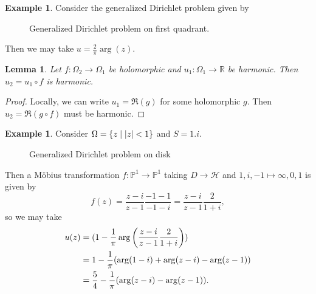 \documentclass[leqno, openany]{memoir}
\newtheorem{lem}[thm]{Lemma}
\theoremstyle{definition}
\newtheorem{exm}[thm]{Example}
\theoremstyle{remark}
\theoremstyle{plain}
\theoremstyle{definition}
\theoremstyle{remark}
\newcommand{\R}{\mathbb{R}}
\renewcommand{\P}{\mathbb{P}}
\newcommand{\mc}[1]{\mathcal{#1}}
\begin{document}
\begin{exm} Consider the generalized Dirichlet problem given by
    \begin{figure}[H] \begin{center}  \end{center}
        \caption{Generalized Dirichlet problem on first quadrant.}%
    \label{fig:} \end{figure} Then we may take $u = \frac{2}{\pi} \arg(z)$.
\end{exm}

\begin{lem} Let $f \colon \Omega_2 \to \Omega_1$ be holomorphic and $u_1 \colon
\Omega_1 \to \R$ be harmonic. Then $u_2 = u_1 \circ f$ is harmonic.  \end{lem}

\begin{proof} Locally, we can write $u_1 = \Re(g)$ for some holomorphic $g$.
Then $u_2 = \Re(g \circ f)$ must be harmonic.  \end{proof}

\begin{exm} Consider $\Omega = \qty{z \mid \abs{z} < 1}$ and $S = \qty{1, i}$.
    \begin{figure}[H] \begin{center}  \end{center} \caption{Generalized Dirichlet problem
        on disk}%
    \end{figure} Then a M\"obius transformation $f
        \colon \P^1 \to \P^1$ taking $D \to \mc{H}$ and $1, i, -1 \mapsto
        \infty, 0, 1$ is given by \[ f(z) = \frac{z-i}{z-1} \frac{-1-1}{-1-i} =
        \frac{z-i}{z-1} \frac{2}{1+i}, \] so we may take \begin{align*} u(z) &=
        (1 - \frac{1}{\pi} \arg \qty(\frac{z-i}{z-1} \frac{2}{1+i})) \\ &= 1 -
        \frac{1}{\pi} (\arg(1-i) + \arg(z-i) -\arg(z-1)) \\ &= \frac{5}{4} -
        \frac{1}{\pi} (\arg(z-i) - \arg(z-1)).  \end{align*} \end{exm}
\end{document}
